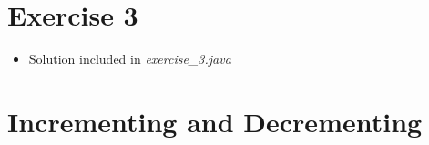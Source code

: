 \documentclass[12pt]{article}
\begin{document}
\bigskip

\section{Exercise 3}

\bigskip

\begin{itemize}
    \item Solution included in \textit{exercise\_3.java}
\end{itemize}

\bigskip

\section{Incrementing and Decrementing}

\bigskip
\end{document}

